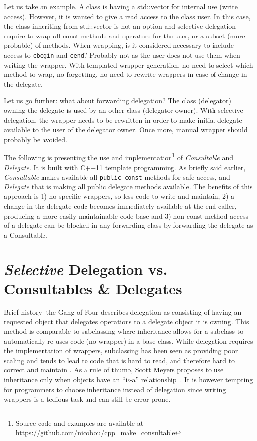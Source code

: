 \documentclass{article}
\begin{document}
Let us take an example. A class is having a std::vector for internal use (write access). However, it is wanted to give a read access to the class user. In this case, the class inheriting from std::vector is not an option and selective delegation require to wrap all const methods and operators for the user, or a subset (more probable) of methods. When wrapping, is it considered necessary to include access to \verb+cbegin+ and \verb+cend+? Probably not as the user does not use them when writing the wrapper. With templated wrapper generation, no need to select which method to wrap, no forgetting, no need to rewrite wrappers in case of change in the delegate.  

Let us go further: what about forwarding delegation? The class (delegator) owning the delegate is used by an other class (delegator owner). With selective delegation, the wrapper needs to be rewritten in order to make initial delegate available to the user of the delegator owner. Once more, manual wrapper should probably be avoided. 

The following is presenting the use and implementation\footnote{Source code and examples are available at\\ \url{https://github.com/nicobou/cpp_make_consultable}} of \textit{Consultable} and \textit{Delegate}. It is built with C++11 template programming. As briefly said earlier, \textit{Consultable} makes available all \verb+public const+ methods for safe access, and \textit{Delegate} that is making all public delegate methods available. The benefits of this approach is 1) no specific wrappers, so less code to write and maintain, 2) a change in the delegate code becomes immediately available at the end caller, producing a more easily maintainable code base and 3) non-const method access of a delegate can be blocked in any forwarding class by forwarding the delegate as a Consultable.

\section{\textit{Selective} Delegation vs. Consultables \& Delegates}
Brief history: the Gang of Four\cite{1995gamma} describes delegation as consisting of having an requested object that delegates operations to a delegate object it is owning. This method is comparable to subclassing where inheritance allows for a subclass to automatically re-uses code (no wrapper) in a base class.  While delegation requires the implementation of wrappers, subclassing has been seen as providing poor scaling and tends to lead to code that is hard to read, and therefore hard to correct and maintain \cite{2007cser}. As a rule of thumb, Scott Meyers proposes to use inheritance only when objects have an ``is-a'' relationship~\cite{2005Meyers}. It is however tempting for programmers to choose inheritance instead of delegation since writing wrappers is a tedious task and can still be error-prone.
\end{document}
